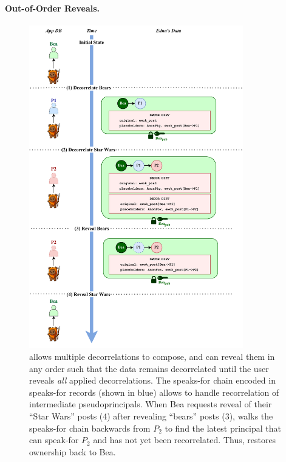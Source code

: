 %
%

\paragraph{Out-of-Order Reveals.}
\label{s:design:oooreveals}

\begin{figure}
\centering
    \includegraphics[width=0.83\textwidth]{figs/composition}
    \caption[Decorrelations can compose and be revealed in any order.]
    {\sys allows multiple decorrelations to compose, and can reveal them in
    any order such that the data remains decorrelated until the user reveals \emph{all}
    applied decorrelations. The speaks-for chain encoded in
    speaks-for records (shown in blue) allows \sys to handle recorrelation of intermediate
    pseudoprincipals. When Bea requests reveal of their ``Star Wars''
    posts (4) after revealing ``bears'' posts (3), \sys walks the speaks-for chain
    backwards from $P_2$ to find the latest principal that can speak-for $P_2$
    and has not yet been recorrelated. Thus, \sys restores ownership back to
    Bea.}
\label{f:composition-desn}
\end{figure}


